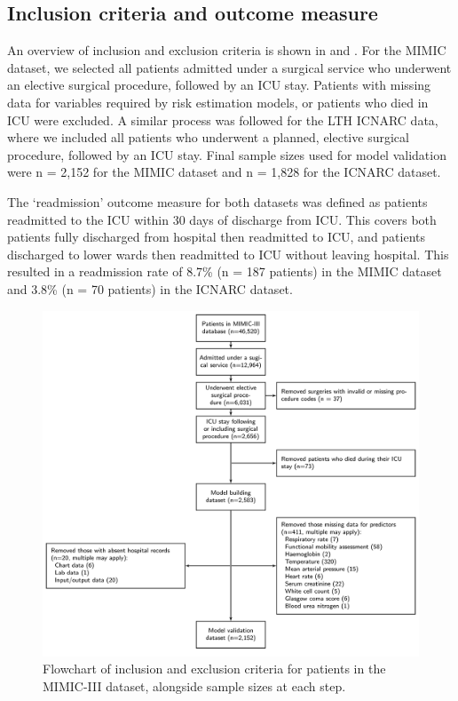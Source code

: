 \documentclass[onecolumn]{article}
\begin{document}
\subsection{Inclusion criteria and outcome measure}

An overview of inclusion and exclusion criteria is shown in  and . For the MIMIC dataset, we selected all patients admitted under a surgical service who underwent an elective surgical procedure, followed by an ICU stay. Patients with missing data for variables required by risk estimation models, or patients who died in ICU were excluded. A similar process was followed for the LTH ICNARC data, where we included all patients who underwent a planned, elective surgical procedure, followed by an ICU stay. Final sample sizes used for model validation were n = 2,152 for the MIMIC dataset and n = 1,828 for the ICNARC dataset.

The `readmission' outcome measure for both datasets was defined as patients readmitted to the ICU within 30 days of discharge from ICU. This covers both patients fully discharged from hospital then readmitted to ICU, and patients discharged to lower wards then readmitted to ICU without leaving hospital. This resulted in a readmission rate of 8.7\% (n = 187 patients) in the MIMIC dataset and 3.8\% (n = 70 patients) in the ICNARC dataset.

\begin{figure}[t]
\centering
	\includegraphics[width=\textwidth]{flowchart_mimic.png}
  \caption{Flowchart of inclusion and exclusion criteria for patients in the MIMIC-III dataset, alongside sample sizes at each step.}
  \label{FlowchartMIMIC}
\end{figure}
\end{document}
